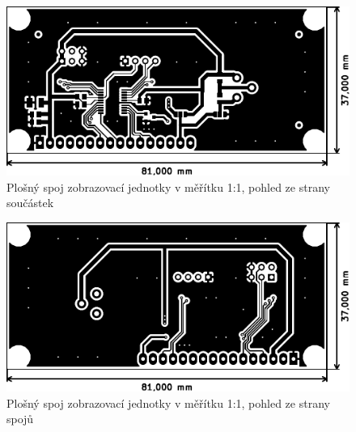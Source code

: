 \begin{figure}[h]
    \centering
    \includegraphics{pcb/display-top}
    \caption{Plošný spoj zobrazovací jednotky v měřítku 1:1, pohled ze strany součástek}
\end{figure}
\begin{figure}[h]
    \centering
    \includegraphics{pcb/display-bot}
    \caption{Plošný spoj zobrazovací jednotky v měřítku 1:1, pohled ze strany spojů}
\end{figure}
